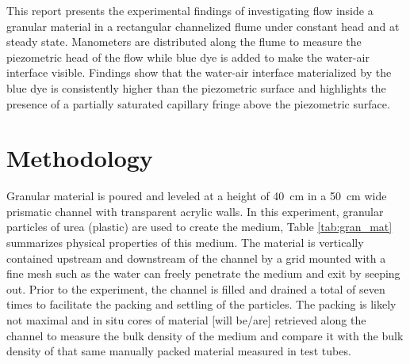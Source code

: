\documentclass[
10pt, %
letterpaper, %
twoside, %
headinclude,footinclude, %
]{scrartcl}
\begin{document}
This report presents the experimental findings of investigating flow inside a granular material in a rectangular channelized flume under constant head and at steady state. Manometers are distributed along the flume to measure the piezometric head of the flow while blue dye is added to make the water-air interface visible. Findings show that the water-air interface materialized by the blue dye is consistently higher than the piezometric surface and highlights the presence of a partially saturated capillary fringe above the piezometric surface.


%


\newpage %


%


\section{Methodology}

Granular material is poured and leveled at a height of \SI{40}{cm} in a \SI{50}{cm} wide prismatic channel with transparent acrylic walls. In this experiment, granular particles of urea (plastic) are used to create the medium, Table \ref{tab:gran_mat} summarizes physical properties of this medium. The material is vertically contained upstream and downstream of the channel by a grid mounted with a fine mesh such as the water can freely penetrate the medium and exit by seeping out. Prior to the experiment, the channel is filled and drained a total of seven times to facilitate the packing and settling of the particles. The packing is likely not maximal and in situ cores of material [will be/are] retrieved along the channel to measure the bulk density of the medium and compare it with the bulk density of that same manually packed material measured in test tubes. 
\end{document}
